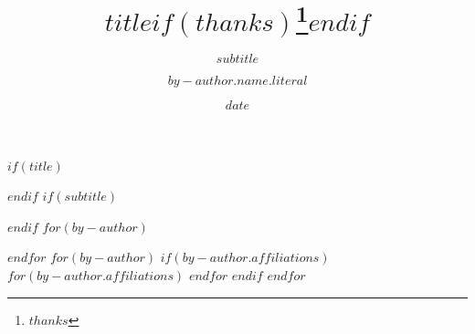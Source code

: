 $if(title)$
\title{$title$$if(thanks)$\thanks{$thanks$}$endif$}
$endif$
%
$if(subtitle)$
\subtitle{$subtitle$}
$endif$
%
$for(by-author)$
\author[$for(by-author.affiliations)$$it.number$$sep$,$endfor$]{$by-author.name.literal$}
$endfor$
%
$for(by-author)$
$if(by-author.affiliations)$
$for(by-author.affiliations)$
$endfor$
$endif$
$endfor$
%
%
\date{$date$}
